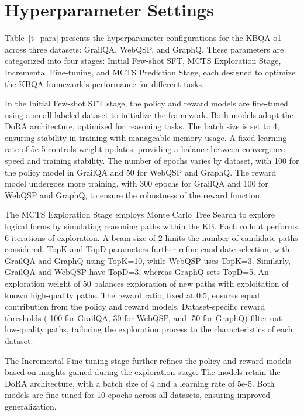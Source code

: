 \documentclass{article}
\theoremstyle{plain}
\theoremstyle{definition}
\theoremstyle{remark}
\begin{document}
\section{Hyperparameter Settings}
\label{hyper}

Table~\ref{t_para} presents the hyperparameter configurations for the KBQA-o1 across three datasets: GrailQA, WebQSP, and GraphQ. These parameters are categorized into four stages: Initial Few-shot SFT, MCTS Exploration Stage, Incremental Fine-tuning, and MCTS Prediction Stage, each designed to optimize the KBQA framework’s performance for different tasks. 

In the Initial Few-shot SFT stage, the policy and reward models are fine-tuned using a small labeled dataset to initialize the framework. Both models adopt the DoRA architecture, optimized for reasoning tasks. The batch size is set to 4, ensuring stability in training with manageable memory usage. A fixed learning rate of 5e{-5} controls weight updates, providing a balance between convergence speed and training stability. The number of epochs varies by dataset, with 100 for the policy model in GrailQA and 50 for WebQSP and GraphQ. The reward model undergoes more training, with 300 epochs for GrailQA and 100 for WebQSP and GraphQ, to ensure the robustness of the reward function.

The MCTS Exploration Stage employs Monte Carlo Tree Search to explore logical forms by simulating reasoning paths within the KB. Each rollout performs 6 iterations of exploration. A beam size of 2 limits the number of candidate paths considered. TopK and TopD parameters further refine candidate selection, with GrailQA and GraphQ using TopK=10, while WebQSP uses TopK=3. Similarly, GrailQA and WebQSP have TopD=3, whereas GraphQ sets TopD=5. An exploration weight of 50 balances exploration of new paths with exploitation of known high-quality paths. The reward ratio, fixed at 0.5, ensures equal contribution from the policy and reward models. Dataset-specific reward thresholds (-100 for GrailQA, 30 for WebQSP, and -50 for GraphQ) filter out low-quality paths, tailoring the exploration process to the characteristics of each dataset.

The Incremental Fine-tuning stage further refines the policy and reward models based on insights gained during the exploration stage. The models retain the DoRA architecture, with a batch size of 4 and a learning rate of 5e{-5}. Both models are fine-tuned for 10 epochs across all datasets, ensuring improved generalization.
\end{document}
